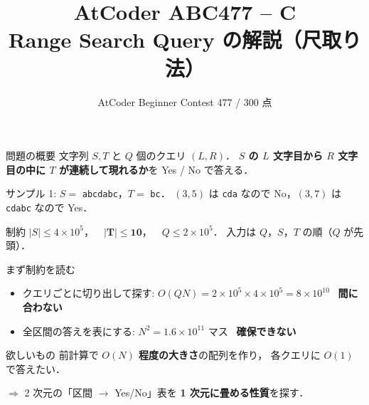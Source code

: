 \documentclass[dvipdfmx,aspectratio=169]{beamer}
\title[ABC477 C]{AtCoder ABC477 -- C\\\small Range Search Query の解説（尺取り法）}
\author[abc477]{}
\institute{}
\date[ABC477]{AtCoder Beginner Contest 477 / 300 点}
\newcommand{\strrow}[1]{%
  \foreach \c [count=\i from 0] in {a,b,c,d,a,b,c}{
    \draw (\i*0.8,#1) rectangle ++(0.8,0.6);
    \node[font=\ttfamily] at (\i*0.8+0.4,#1+0.3) {\c};
  }}
\begin{document}
\begin{frame}
  \titlepage
\end{frame}

\begin{frame}{問題の概要}
  文字列 $S, T$ と $Q$ 個のクエリ $(L, R)$．
  \textbf{$S$ の $L$ 文字目から $R$ 文字目の中に $T$ が連続して現れるか}を Yes / No で答える．

  \vspace{0.6em}
  \begin{center}
  \end{center}

  \vspace{0.3em}
  サンプル 1: $S=$ \texttt{abcdabc}，$T=$ \texttt{bc}．
  $(3,5)$ は \texttt{cda} なので No，$(3,7)$ は \texttt{cdabc} なので Yes．

  \vspace{0.4em}
  \begin{alertblock}{制約}
    $|S| \le 4\times10^5$，\ \ $\mathbf{|T| \le 10}$，\ \ $Q \le 2\times10^5$．
    入力は $Q$，$S$，$T$ の順（$Q$ が先頭）．
  \end{alertblock}
\end{frame}

\begin{frame}{まず制約を読む}
  \begin{itemize}
    \item クエリごとに切り出して探す: $O(QN) = 2\times10^5 \times 4\times10^5 = 8\times10^{10}$
      \ \textcolor{ng}{\textbf{間に合わない}}
    \item 全区間の答えを表にする: $N^2 = 1.6\times10^{11}$ マス
      \ \textcolor{ng}{\textbf{確保できない}}
  \end{itemize}

  \vspace{0.6em}
  \begin{block}{欲しいもの}
    前計算で \textbf{$O(N)$ 程度の大きさ}の配列を作り，
    各クエリに \textbf{$O(1)$} で答えたい．
  \end{block}

  \vspace{0.6em}
  $\Rightarrow$ 2 次元の「区間 $\to$ Yes/No」表を \textbf{1 次元に畳める性質}を探す．
\end{frame}
\end{document}
